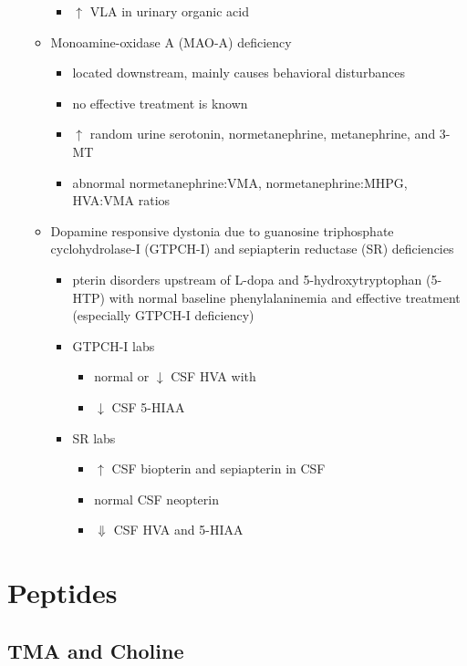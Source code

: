\documentclass{scrartcl}
\begin{document}
\begin{itemize}
\begin{itemize}
\begin{itemize}
\item \(\uparrow\) VLA in urinary organic acid
\end{itemize}
\item Monoamine-oxidase A (MAO-A) deficiency
\begin{itemize}
\item located downstream, mainly causes behavioral disturbances
\item no effective treatment is known
\item \(\uparrow\) random urine serotonin, normetanephrine, metanephrine, and 3-MT
\item abnormal normetanephrine:VMA, normetanephrine:MHPG, HVA:VMA ratios
\end{itemize}
\item Dopamine responsive dystonia due to guanosine triphosphate cyclohydrolase-I (GTPCH-I) and
sepiapterin reductase (SR) deficiencies
\begin{itemize}
\item pterin disorders upstream of L-dopa and
5-hydroxytryptophan (5-HTP) with normal baseline
phenylalaninemia and effective treatment (especially GTPCH-I
deficiency)
\item GTPCH-I labs
\begin{itemize}
\item normal or \(\downarrow\) CSF HVA with
\item \(\downarrow\) CSF 5-HIAA
\end{itemize}
\item SR labs
\begin{itemize}
\item \(\uparrow\) CSF biopterin and sepiapterin in CSF
\item normal CSF neopterin
\item \(\Downarrow\) CSF HVA and 5-HIAA
\end{itemize}
\end{itemize}
\end{itemize}
\end{itemize}
\section{Peptides}
\label{sec:org3a17d3b}
\subsection{TMA and Choline}
\label{sec:org51051b5}
\end{document}
